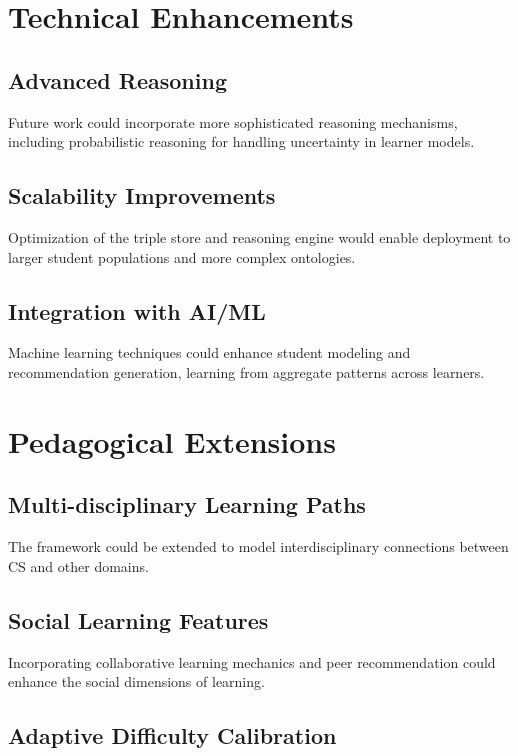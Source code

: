 \section{Technical Enhancements}

\subsection{Advanced Reasoning}

Future work could incorporate more sophisticated reasoning mechanisms, including probabilistic reasoning for handling uncertainty in learner models.

\subsection{Scalability Improvements}

Optimization of the triple store and reasoning engine would enable deployment to larger student populations and more complex ontologies.

\subsection{Integration with AI/ML}

Machine learning techniques could enhance student modeling and recommendation generation, learning from aggregate patterns across learners.

\section{Pedagogical Extensions}

\subsection{Multi-disciplinary Learning Paths}

The framework could be extended to model interdisciplinary connections between CS and other domains.

\subsection{Social Learning Features}

Incorporating collaborative learning mechanics and peer recommendation could enhance the social dimensions of learning.

\subsection{Adaptive Difficulty Calibration}


